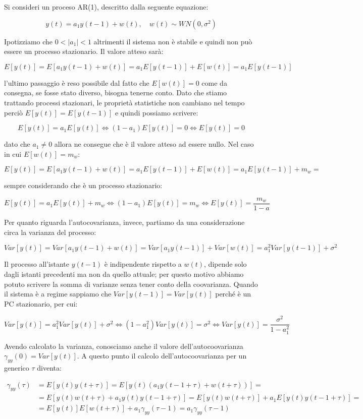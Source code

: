 \begin{esempio}
Si consideri un proceso AR(1), descritto dalla seguente equazione:

  \[ y(t)=a_1y(t-1)+w(t),\quad w(t) \sim WN(0,\sigma^2) \]
  
Ipotizziamo che $0<|a_1|<1$ altrimenti il sistema non è stabile e quindi non può essere un processo stazionario. Il valore atteso sarà:

  \[ E[y(t)]=E[a_1y(t-1)+w(t)]=a_1E[y(t-1)]+E[w(t)]=a_1E[y(t-1)] \]

l'ultimo passaggio è reso possibile dal fatto che $E[w(t)]=0$ come da consegna, se fosse stato diverso, bisogna tenerne conto. Dato che stiamo trattando processi stazionari, le proprietà statistiche non cambiano nel tempo perciò $E[y(t)]=E[y(t-1)]$ e quindi possiamo scrivere:

  \[ E[y(t)]=a_1E[y(t)] \Longleftrightarrow (1-a_1)E[y(t)]=0 \Longleftrightarrow E[y(t)]=0 \]

dato che $a_1 \neq 0$ allora ne consegue che è il valore atteso ad essere nullo. Nel caso in cui $E[w(t)]=m_w$:

  \[ E[y(t)]=E[a_1y(t-1)+w(t)]=a_1E[y(t-1)]+E[w(t)]=a_1E[y(t-1)]+m_w= \]
  
sempre considerando che è un processo stazionario:

  \[  E[y(t)]=a_1E[y(t)]+m_w \Longleftrightarrow  (1-a_1)E[y(t)]=m_w \Longleftrightarrow  E[y(t)]=\frac{m_w}{1-a}\]
  
Per quanto riguarda l'autocovarianza, invece, partiamo da una considerazione circa la varianza del processo:

  \[ Var[y(t)]=Var[a_1y(t-1)+w(t)]=Var[a_1y(t-1)]+Var[w(t)]=a_1^2Var[y(t-1)]+\sigma^2 \]
  
Il processo all'istante $y(t-1)$ è indipendente rispetto a $w(t)$, dipende solo dagli istanti precedenti ma non da quello attuale; per questo motivo abbiamo potuto scrivere la somma di varianze senza tener conto della coovarianza. Quando il sistema è a regime sappiamo che $Var[y(t-1)]=Var[y(t)]$ perché è un PC stazionario, per cui:

  \[ Var[y(t)]=a_1^2Var[y(t)]+\sigma^2 \Longleftrightarrow (1-a_1^2)Var[y(t)]=\sigma^2 \Longleftrightarrow Var[y(t)]=\frac{\sigma^2}{1-a_1^2} \]

Avendo calcolato la varianza, conosciamo anche il valore dell'autocoovarianza $\gamma_{yy}(0)=Var[y(t)]$. A questo punto il calcolo dell'autocoovarianza per un generico $\tau$ diventa:

  \[ 
    \begin{split}
      \gamma_{yy}(\tau)&=E[y(t)y(t+\tau)]=E[y(t)(a_1y(t-1+\tau)+w(t+\tau))]=\\
      &=E[y(t)w(t+\tau)+a_1y(t)y(t-1+\tau)]=E[y(t)w(t+\tau)]+a_1E[y(t)y(t-1+\tau)]=\\
      &=E[y(t)]E[w(t+\tau)]+a_1\gamma_{yy}(\tau-1)=a_1\gamma_{yy}(\tau-1)
    \end{split}
   \]


\end{esempio}
